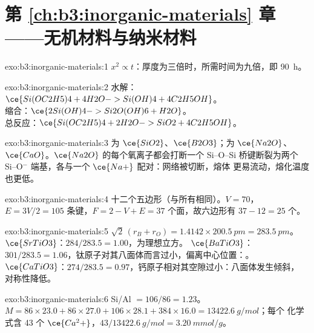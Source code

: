 \section*{第 \ref{ch:b3:inorganic-materials} 章——无机材料与纳米材料}

\begin{solution}{exo:b3:inorganic-materials:1}
$x^2 \propto t$：厚度为三倍时，所需时间为九倍，即 \qty{90}{h}。
\end{solution}

\begin{solution}{exo:b3:inorganic-materials:2}
水解：$\ce{Si(OC2H5)4 + 4H2O -> Si(OH)4 + 4C2H5OH}$。\\
缩合：$\ce{2Si(OH)4 -> Si2O(OH)6 + H2O}$。\\
总反应：$\ce{Si(OC2H5)4 + 2H2O -> SiO2 + 4C2H5OH}$。
\end{solution}

\begin{solution}{exo:b3:inorganic-materials:3}
为 $\ce{SiO2}$、$\ce{B2O3}$；为 $\ce{Na2O}$、$\ce{CaO}$。$\ce{Na2O}$ 的每个氧离子都会打断一个 Si--O--Si
桥键断裂为两个 Si--O$^-$ 端基，各与一个 $\ce{Na+}$ 配对：网络被切断，熔体
更易流动，熔化温度也更低。
\end{solution}

\begin{solution}{exo:b3:inorganic-materials:4}
十二个五边形（与所有相同）。$V = 70$，$E = 3V/2 = 105$ 条键，$F = 2 - V + E = 37$
个面，故六边形有 $37 - 12 = 25$ 个。
\end{solution}

\begin{solution}{exo:b3:inorganic-materials:5}
$\sqrt2\,(r_B + r_O) = 1.4142 \times \qty{200.5}{pm} = \qty{283.5}{pm}$。$\ce{SrTiO3}$：$284/283.5 = 1.00$，为理想立方。
$\ce{BaTiO3}$：$301/283.5 = 1.06$，钛原子对其八面体而言过小，偏离中心位置：。
$\ce{CaTiO3}$：$274/283.5 = 0.97$，钙原子相对其空隙过小：八面体发生倾斜，
对称性降低。
\end{solution}

\begin{solution}{exo:b3:inorganic-materials:6}
Si/Al $= 106/86 = 1.23$。$M = 86 \times 23.0 + 86 \times 27.0 + 106 \times 28.1 + 384 \times 16.0 = \qty{13422.6}{g/mol}$；每个
化学式含 43 个 $\ce{Ca^2+}$，$43/\qty{13422.6}{g/mol} = \qty{3.20}{mmol/g}$。
\end{solution}

